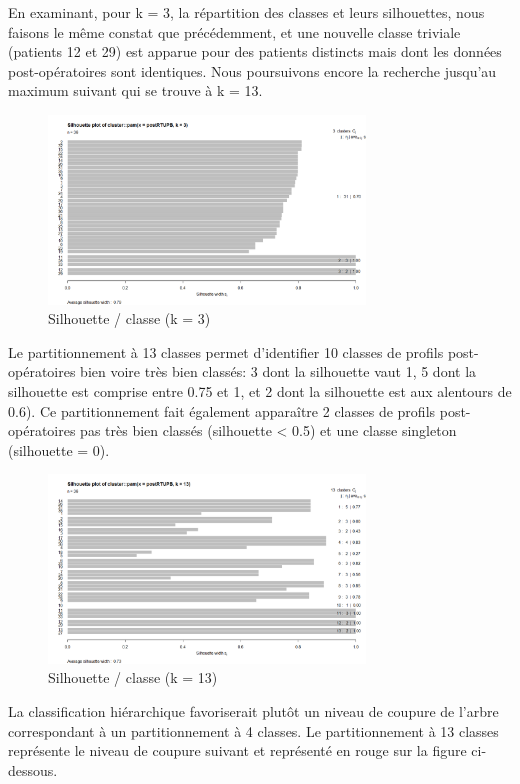 En examinant, pour k = 3, la répartition des classes et leurs silhouettes, nous faisons le même constat que précédemment, et une nouvelle classe triviale (patients 12 et 29) est apparue pour des patients distincts
mais dont les données post-opératoires sont identiques. Nous poursuivons encore la recherche jusqu'au maximum suivant qui se trouve à k = 13.

\begin{figure}[H]
\centering
\includegraphics[width=0.75\textwidth]{../Fig/RTUPB/rtupb-sil-k3-post.png}
\caption{Silhouette / classe (k = 3)}
\end{figure}

Le partitionnement à 13 classes permet d'identifier 10 classes de profils post-opératoires bien voire très bien classés: 3 dont la silhouette vaut 1, 5 dont la silhouette est comprise entre 0.75 et 1, et 2 dont la silhouette
est aux alentours de 0.6). Ce partitionnement fait également apparaître 2 classes de profils post-opératoires pas très bien classés (silhouette < 0.5) et une classe singleton (silhouette = 0). 

\begin{figure}[H]
\centering
\includegraphics[width=0.75\textwidth]{../Fig/RTUPB/rtupb-sil-k13-post.png}
\caption{Silhouette / classe (k = 13)}
\end{figure}

La classification hiérarchique favoriserait plutôt un niveau de coupure de l'arbre correspondant à un partitionnement à 4 classes. Le partitionnement à 13 classes représente le niveau de coupure suivant et représenté en rouge sur la figure ci-dessous.

